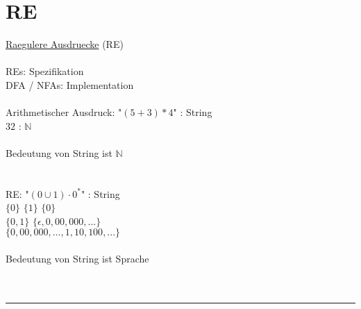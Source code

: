 \documentclass[18pt,a4paper]{scrreprt}
\newcommand{\tab}{\hspace*{2em}}
\begin{document}
\section{RE}

\uline{Raegulere Ausdruecke} (RE)\\
\\
REs: Spezifikation\\
DFA / NFAs: Implementation\\
\\
Arithmetischer Ausdruck: "$(5+3)*4$" \: : String\\
\tab \tab  \tab \tab \tab \tab \tab $32$ \tab\:\: : $\mathbb{N}$\\
\\
Bedeutung von String ist $\mathbb{N}$\\
\\
\\
RE: "$(0 \cup 1) \cdot 0^*$" : String\\
\tab\: $\{0\}$ $\{1\}$ $\{0\}$\\
\tab\: $\{0,1\}$ $\{\epsilon, 0, 00, 000, ...\}$\\
\tab\: $\{0, 00, 000, ... , 1, 10, 100, ... \}$\\
\\
Bedeutung von String ist Sprache\\
\\
\\
\rule{\textwidth}{0.4mm}\\
\\
\end{document}
